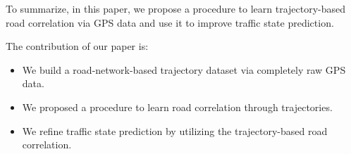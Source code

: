 To summarize, in this paper, we propose a procedure to learn trajectory-based road correlation via GPS data and use it to improve traffic state prediction.

The contribution of our paper is:
\begin{itemize}
    \item We build a road-network-based trajectory dataset via completely raw GPS data.
    \item We proposed a procedure to learn road correlation through trajectories.
    \item We refine traffic state prediction by utilizing the trajectory-based road correlation.
\end{itemize}
